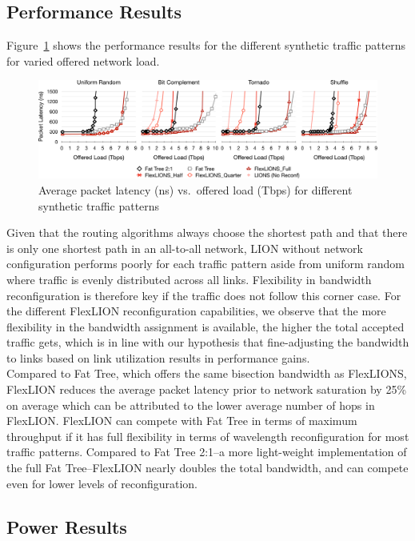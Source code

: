 \subsection{Performance Results}
Figure~\ref{fig:latsyn} shows the performance results for the different synthetic traffic patterns for varied offered network load. 
\begin{figure}[t!]
        \includegraphics[width=\textwidth, clip]{Figures/syn.pdf}
        \caption{Average packet latency (ns) vs.\ offered load (Tbps) for different synthetic traffic patterns}
        		\label{fig:latsyn}
\end{figure}
Given that the routing algorithms always choose the shortest path and that there is only one shortest path in an all-to-all network, LION without network configuration performs poorly for each traffic pattern aside from uniform random where traffic is evenly distributed across all links. Flexibility in bandwidth reconfiguration is therefore key if the traffic does not follow this corner case. For the different FlexLION reconfiguration capabilities, we observe that the more flexibility in the bandwidth assignment is available, the higher the total accepted traffic gets, which is in line with our hypothesis that fine-adjusting the bandwidth to links based on link utilization results in performance gains. \\
Compared to Fat Tree, which offers the same bisection bandwidth as FlexLIONS, FlexLION reduces the average packet latency prior to network saturation by 25\% on average which can be attributed to the lower average number of hops in FlexLION. FlexLION can compete with Fat Tree in terms of maximum throughput if it has full flexibility in terms of  wavelength reconfiguration for most traffic patterns. Compared to Fat Tree 2:1--a more light-weight implementation of the full Fat Tree--FlexLION nearly doubles the total bandwidth, and can compete even for lower levels of reconfiguration. 

\subsection{Power Results}
